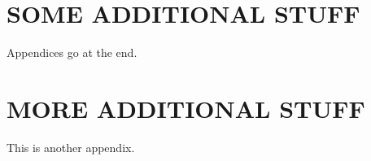 
\chapter{SOME ADDITIONAL STUFF}

Appendices go at the end.

\chapter{MORE ADDITIONAL STUFF}

This is another appendix.